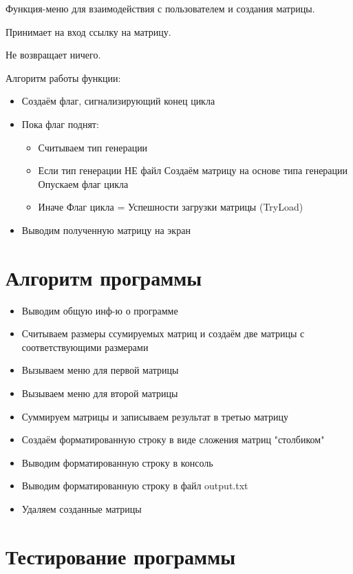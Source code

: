 \documentclass[12pt,a4paper]{article}  %
\begin{document}
	Функция-меню для взаимодействия с пользователем и создания матрицы.

	Принимает на вход ссылку на матрицу.

	Не возвращает ничего.

	Алгоритм работы функции:

	\begin{itemize}
		\item Создаём флаг, сигнализирующий конец цикла
		\item Пока флаг поднят:
		\begin{itemize}
			  \item Считываем тип генерации
			  \item Если тип генерации НЕ файл
			  \subitem Создаём матрицу на основе типа генерации
			  \subitem Опускаем флаг цикла
			  \item Иначе
			  \subitem Флаг цикла = Успешности загрузки матрицы (TryLoad)
		\end{itemize}
		\item Выводим полученную матрицу на экран
	\end{itemize}
	
	\section*{Алгоритм программы}

	\begin{itemize}
		\item Выводим общую инф-ю о программе
		\item Считываем размеры ссумируемых матриц и создаём две матрицы
		с соответствующими размерами
		\item Вызываем меню для первой матрицы
		\item Вызываем меню для второй матрицы
		\item Суммируем матрицы и записываем результат в третью матрицу
		\item Создаём форматированную строку в виде сложения матриц "столбиком"
		\item Выводим форматированную строку в консоль
		\item Выводим форматированную строку в файл output.txt
		\item Удаляем созданные матрицы
	\end{itemize}
	
	\section*{Тестирование программы}
	
\end{document}
